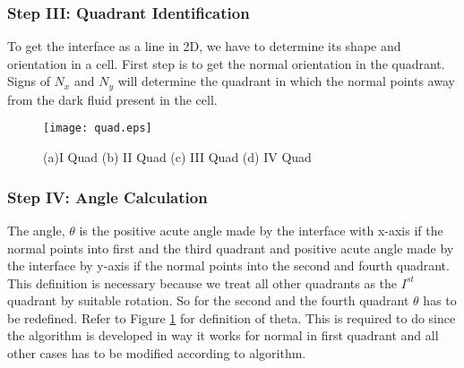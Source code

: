 \subsubsection{Step III: Quadrant Identification}
To get the interface as a line in 2D, we have to determine its shape and orientation in a cell. First step is to get the normal orientation in the quadrant.
 Signs of $N_x$ and $N_y$ will determine the quadrant in which the normal points away from the dark fluid present in the cell. 
  \begin{figure}%
  \centering
   \texttt{[image: quad.eps]}
   \caption[Interface normal direction]{(a)I Quad (b) II Quad (c) III Quad (d) IV Quad }
   \label{Fig:quad}
  \end{figure}

\subsubsection{Step IV: Angle Calculation}
 The angle, $\theta$ is the positive acute angle made by the interface with x-axis if the normal points into first and the third quadrant and positive acute angle made by 
 the interface by y-axis if the normal points into the second and fourth quadrant. This definition is necessary because we treat all other quadrants as the $I^{st}$ quadrant
 by suitable rotation. So for the second and the fourth quadrant $\theta$ has to be redefined. Refer to Figure \ref{Fig:quad} for definition of theta. This is 
 required to do since the algorithm is developed in way it works for normal in first quadrant and all other cases has to be modified according to algorithm.
% 
%  

